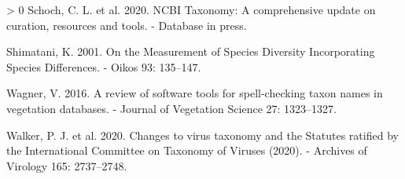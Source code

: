 \documentclass[11pt]{article}
\newlength{\cslhangindent}
\newenvironment{CSLReferences}[3] %
 {%
  \setlength{\parindent}{0pt}
  \ifodd #1 \everypar{\setlength{\hangindent}{\cslhangindent}}\ignorespaces\fi
  \ifnum #2 > 0
  \setlength{\parskip}{#2\baselineskip}
  \fi
 }%
 {}
\begin{document}
\begin{CSLReferences}{1}{0}
\leavevmode\hypertarget{ref-Schoch2020NcbTax}{}%
Schoch, C. L. et al. 2020. NCBI Taxonomy: A comprehensive update on
curation, resources and tools. - Database in press.

\leavevmode\hypertarget{ref-Shimatani2001MeaSpe}{}%
Shimatani, K. 2001. On the Measurement of Species Diversity
Incorporating Species Differences. - Oikos 93: 135--147.

\leavevmode\hypertarget{ref-Wagner2016RevSof}{}%
Wagner, V. 2016. A review of software tools for spell-checking taxon
names in vegetation databases. - Journal of Vegetation Science 27:
1323--1327.

\leavevmode\hypertarget{ref-Walker2020ChaVir}{}%
Walker, P. J. et al. 2020. Changes to virus taxonomy and the Statutes
ratified by the International Committee on Taxonomy of Viruses (2020). -
Archives of Virology 165: 2737--2748.

\end{CSLReferences}
\end{document}
